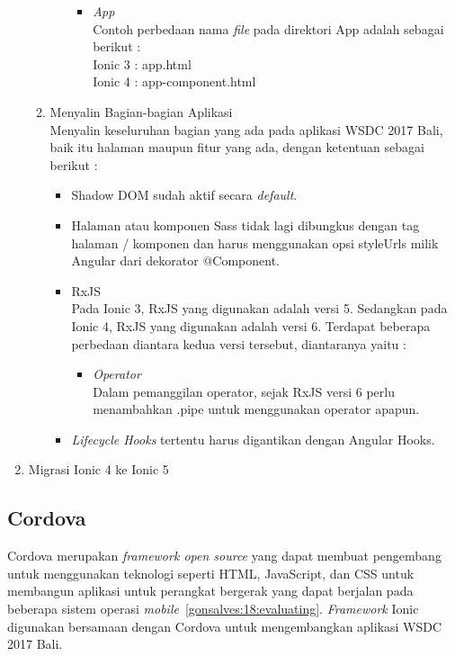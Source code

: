 \begin{enumerate}
\begin{enumerate}
\begin{itemize}
\begin{itemize}
				\item {\it App} \\
				Contoh perbedaan nama {\it file} pada direktori App adalah sebagai berikut : \\
				Ionic 3 : app.html \\
				Ionic 4 : app-component.html
			\end{itemize}
			
		\end{itemize}

		\item Menyalin Bagian-bagian Aplikasi \\
		Menyalin keseluruhan bagian yang ada pada aplikasi WSDC 2017 Bali, baik itu halaman maupun fitur yang ada, dengan ketentuan sebagai berikut :
		\begin{itemize}
			\item Shadow DOM sudah aktif secara {\it default}.
			\item Halaman atau komponen Sass tidak lagi dibungkus dengan tag halaman / komponen dan harus menggunakan opsi styleUrls milik Angular dari dekorator @Component.
			\item RxJS \\
			Pada Ionic 3, RxJS yang digunakan adalah versi 5. Sedangkan pada Ionic 4, RxJS yang digunakan adalah versi 6. Terdapat beberapa perbedaan diantara kedua versi tersebut, diantaranya yaitu :
			\begin{itemize}
				\item {\it Operator} \\
				Dalam pemanggilan operator, sejak RxJS versi 6 perlu menambahkan .pipe untuk menggunakan operator apapun.
			\end{itemize}
			\item {\it Lifecycle Hooks} tertentu harus digantikan dengan Angular Hooks.
		\end{itemize}
	\end{enumerate}
	\item Migrasi Ionic 4 ke Ionic 5 \\
\end{enumerate}

\subsection{Cordova}
\label{subsec:cordova}
Cordova merupakan {\it framework open source} yang dapat membuat pengembang untuk menggunakan teknologi seperti HTML, JavaScript, dan CSS untuk membangun aplikasi untuk perangkat bergerak yang dapat berjalan pada beberapa sistem operasi {\it mobile}~\ref{gonsalves:18:evaluating}. {\it Framework} Ionic digunakan bersamaan dengan Cordova untuk mengembangkan aplikasi WSDC 2017 Bali. 

